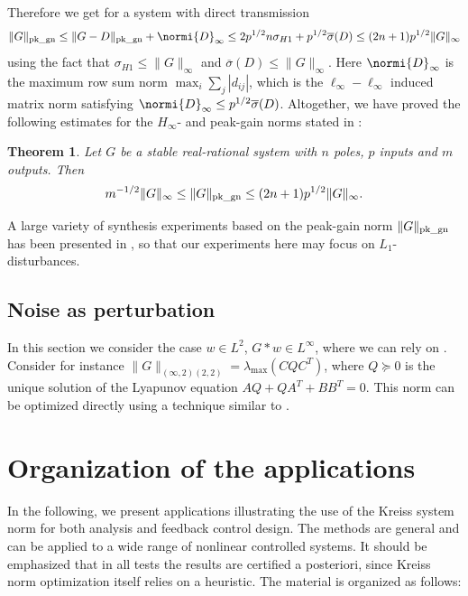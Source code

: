 \documentclass[12pt, a4paper,reqno]{amsart}
\newtheorem{theorem}{\bf Theorem}
\theoremstyle{definition}
\begin{document}
Therefore we get
for a system with direct transmission
$$
\|G\|_{\rm pk\_gn}
\leq \|G-D\|_{\rm pk\_gn} + \normi{D}_\infty
\leq 2p^{1/2}n\sigma_{H1} + p^{1/2} \overline{\sigma}(D) \leq (2n+1)p^{1/2} \|G\|_\infty
$$
using the fact that  $\sigma_{H1} \leq \|G\|_\infty$ and $\overline{\sigma}(D) \leq \|G\|_\infty$.
Here $\normi{D}_\infty$ is the maximum row sum norm $\max_i \sum_j |d_{ij}|$, which is the $\ell_\infty-\ell_\infty$ induced
matrix norm satisfying $\normi{D}_\infty\leq p^{1/2} \overline{\sigma}(D)$. 
%
Altogether, we have proved the following estimates for the $H_\infty$- and peak-gain norms stated in \cite{mixedApkarianNoll}:
\begin{theorem}
    Let $G$ be a stable real-rational system with $n$ poles, $p$ inputs and $m$ outputs. Then
    $$
    m^{-1/2} \|G\|_\infty \leq \|G\|_{\rm pk\_gn} \leq (2n+1)p^{1/2}\|G\|_\infty.
    $$
\end{theorem}
A large variety of synthesis experiments based on the peak-gain norm $\|G\|_{\rm pk\_gn}$ has been presented
in \cite{mixedApkarianNoll}, so that our experiments here may focus on $L_1$-disturbances.

\subsection{Noise as perturbation}
\label{sect_noise}
In this section we consider the case $w\in L^2$, $G\ast w\in L^\infty$, where we can rely on \cite{induced_norms}.
Consider for instance
$\|G\|_{(\infty,2) (2,2)} = \lambda_{\max}(C QC^T)$, where $Q \succeq 0$ is the unique solution of the Lyapunov equation
$AQ+QA^T + BB^T=0$. This norm can be optimized directly using a technique similar to
\cite{dao}.


\section*{Organization of the applications}

In the following, we present applications illustrating the use of the Kreiss system norm for both analysis and feedback control design. The methods are general and can be applied to a wide range of nonlinear controlled systems. It should be emphasized that in all tests the results are certified a posteriori, since Kreiss norm optimization itself relies on a heuristic.
%
The material is organized as follows:
\end{document}
